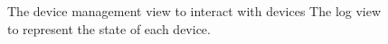 \begin{figure}%
	\centering
	
	\hspace{15pt}%
	\caption[The device management interface.]{
		 The device management view to interact with devices
		 The log view to represent the state of each device.}%
	\label{fig:web_int_dev}%
\end{figure}
